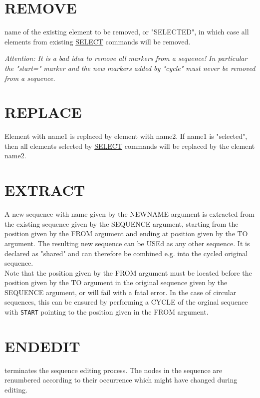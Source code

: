 \section{REMOVE}
\label{sec:remove}
\begin{madlist}
    name of the existing element to be removed, or
     "SELECTED", in which case all elements from existing
     \href{../Introduction/select.html}{SELECT} commands will be
     removed. 
\end{madlist}

\textit{Attention: It is a bad idea to remove all markers from
  a sequence! In particular the "start=" marker and the new markers
  added by "cycle" must never be removed from a sequence.} 


\section{REPLACE}
\label{sec:replace}
Element with name1 is replaced by element with name2. 
If name1 is "selected", then all elements selected by
\href{../Introduction/select.html}{SELECT} commands will be replaced by
the element name2.  

\section{EXTRACT}
\label{sec:extract}
A new sequence with name given by the NEWNAME argument is extracted from
the existing sequence given by the SEQUENCE argument, 
starting from the position given by the FROM argument and ending at
position given by the TO argument. The resulting new sequence
can be USEd as any other sequence. It is declared as "shared" and
can therefore be combined e.g. into the cycled original sequence. \\ 
Note that the position given by the FROM argument must be located before
the position given by the TO argument in the original sequence given by
the SEQUENCE argument, or \mad will fail with a fatal error. 
In the case of circular sequences, this can be ensured by performing a CYCLE 
of the orginal sequence with {\tt START} pointing to the position given
in the FROM argument. 


\section{ENDEDIT}
\label{sec:endedit}
terminates the sequence editing process. The nodes in the sequence are
renumbered according to their occurrence which might have changed during
editing.  



